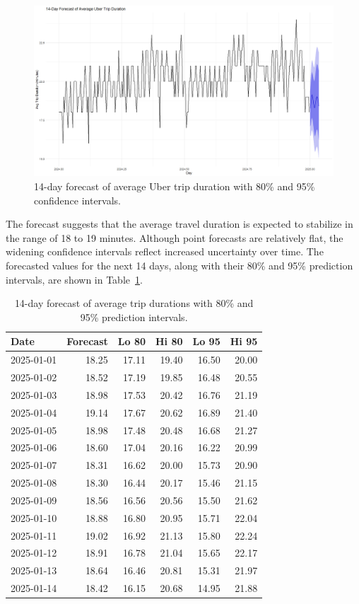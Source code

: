 \documentclass{article}
\begin{document}
\begin{figure}
  \includegraphics[width=\textwidth]{finalproject/images/forecast-plot.png}
  \caption{14-day forecast of average Uber trip duration with 80\% and 95\% confidence intervals.}
  \label{fig:forecast_plot}
\end{figure}

The forecast suggests that the average travel duration is expected to stabilize in the range of 18 to 19 minutes. Although point forecasts are relatively flat, the widening confidence intervals reflect increased uncertainty over time. The forecasted values for the next 14 days, along with their 80\% and 95\% prediction intervals, are shown in Table~\ref{tab:forecast_values}.

\begin{table}[ht]
\centering
\caption{14-day forecast of average trip durations with 80\% and 95\% prediction intervals.}
\label{tab:forecast_values}
\begin{tabular}{lrrrrr}
\toprule
Date & Forecast & Lo 80 & Hi 80 & Lo 95 & Hi 95 \\
\midrule
2025-01-01 & 18.25 & 17.11 & 19.40 & 16.50 & 20.00 \\
2025-01-02 & 18.52 & 17.19 & 19.85 & 16.48 & 20.55 \\
2025-01-03 & 18.98 & 17.53 & 20.42 & 16.76 & 21.19 \\
2025-01-04 & 19.14 & 17.67 & 20.62 & 16.89 & 21.40 \\
2025-01-05 & 18.98 & 17.48 & 20.48 & 16.68 & 21.27 \\
2025-01-06 & 18.60 & 17.04 & 20.16 & 16.22 & 20.99 \\
2025-01-07 & 18.31 & 16.62 & 20.00 & 15.73 & 20.90 \\
2025-01-08 & 18.30 & 16.44 & 20.17 & 15.46 & 21.15 \\
2025-01-09 & 18.56 & 16.56 & 20.56 & 15.50 & 21.62 \\
2025-01-10 & 18.88 & 16.80 & 20.95 & 15.71 & 22.04 \\
2025-01-11 & 19.02 & 16.92 & 21.13 & 15.80 & 22.24 \\
2025-01-12 & 18.91 & 16.78 & 21.04 & 15.65 & 22.17 \\
2025-01-13 & 18.64 & 16.46 & 20.81 & 15.31 & 21.97 \\
2025-01-14 & 18.42 & 16.15 & 20.68 & 14.95 & 21.88 \\
\bottomrule
\end{tabular}
\end{table}
\end{document}
